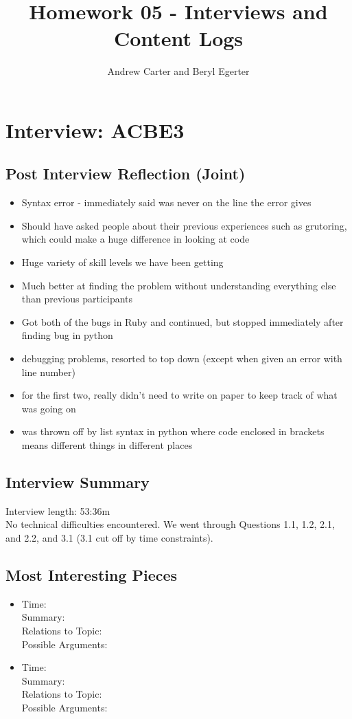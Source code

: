 \documentclass{article}
\title{Homework 05 - Interviews and Content Logs}
\author{Andrew Carter and Beryl Egerter}
\begin{document}
\maketitle
\section{Interview: ACBE3}
\subsection{Post Interview Reflection (Joint)}
\begin{itemize}
  \item Syntax error - immediately said was never on the line the error gives
  \item Should have asked people about their previous experiences such as grutoring, which could make a huge difference in looking at code
  \item Huge variety of skill levels we have been getting
  \item Much better at finding the problem without understanding everything else than previous participants
  \item Got both of the bugs in Ruby and continued, but stopped immediately after finding bug in python
  \item debugging problems, resorted to top down (except when given an error with line number)
  \item for the first two, really didn't need to write on paper to keep track of what was going on
  \item was thrown off by list syntax in python where code enclosed in brackets means different things in different places
\end{itemize}
\subsection{Interview Summary}
Interview length:  53:36m \\
No technical difficulties encountered.
We went through Questions 1.1, 1.2, 2.1, and 2.2, and 3.1 (3.1 cut off by time constraints). 
\subsection{Most Interesting Pieces}
\begin{itemize}
  \item Time:  \\
  Summary: \\
  Relations to Topic:  \\
  Possible Arguments: 
  \item Time:  \\
  Summary: \\
  Relations to Topic: \\
  Possible Arguments: 
\end{itemize}
\end{document}
